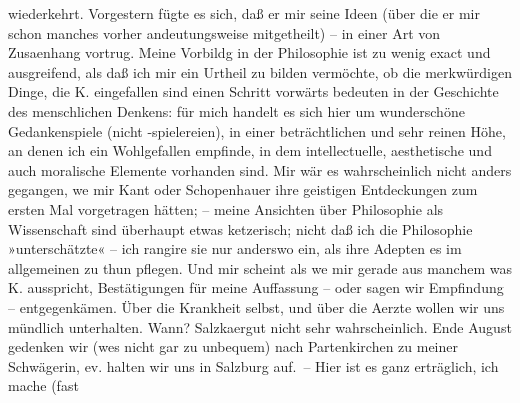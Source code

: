 \begin{ledgroupsized}[t]{13cm}
               wiederkehrt. Vorgestern fügte es sich, daß er mir seine Ideen (über die er mir schon
               manches vorher andeutungsweise mitgetheilt) – in einer Art von Zusa{\geminationm}enhang vortrug. Meine \strikeout{\textcolor{gray}{×}\-\textcolor{gray}{×}\-\textcolor{gray}{×}\-\textcolor{gray}{×}\-\textcolor{gray}{×}} Vorbildg in der Philosophie \introOben{}ist\introOben{} zu wenig exact und
               ausgreifend, als daß ich mir ein Urtheil zu bilden vermöchte, ob die merkwürdigen
               Dinge, die K. eingefallen sind einen Schritt
               vorwärts bedeuten in der Geschichte des menschlichen Denkens: für mich handelt es
               sich hier um wunderschöne Gedankenspiele (nicht -spielereien), in einer
               beträchtlichen und sehr reinen Höhe, an denen ich ein Wohlgefallen empfinde, in dem
                   intellectuelle, aesthetische und auch moralische
               Elemente vorhanden sind. Mir wär es wahrscheinlich nicht anders gegangen, we{\geminationn} mir Kant oder Schopenhauer ihre geistigen Entdeckungen zum ersten
               Mal vorgetragen hätten; – meine Ansichten über Philosophie als Wissenschaft {\pb}sind überhaupt etwas ketzerisch; nicht daß ich die
               Philosophie »unterschätzte« – ich rangire sie nur anderswo ein, als ihre Adepten es
               im allgemeinen zu thun pflegen. Und mir scheint als we{\geminationn}
               mir gerade aus manchem was K. ausspricht,
               Bestätigungen für meine Auffassung – oder sagen wir Empfindung – entgegenkämen. Über
               die Krankheit selbst, und über die Aerzte wollen wir uns mündlich unterhalten. Wann?
                  Salzka{\geminationm}ergut nicht
               sehr wahrscheinlich. Ende August gedenken wir (we{\geminationn}s nicht gar zu unbequem) nach Partenkirchen zu meiner Schwägerin, ev. halten wir uns in Salzburg auf. – Hier ist es ganz erträglich, ich mache (fast

\end{ledgroupsized}
